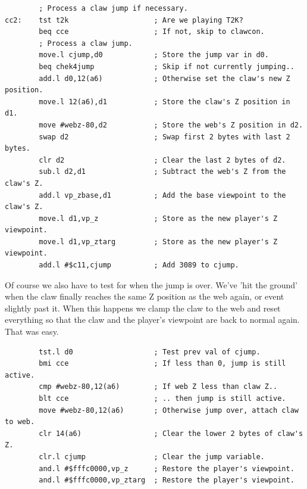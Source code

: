 \begin{lstlisting}
        ; Process a claw jump if necessary.
cc2:    tst t2k                    ; Are we playing T2K?
        beq cce                    ; If not, skip to clawcon.
        ; Process a claw jump.
        move.l cjump,d0            ; Store the jump var in d0.
        beq chek4jump              ; Skip if not currently jumping..
        add.l d0,12(a6)            ; Otherwise set the claw's new Z position.
        move.l 12(a6),d1           ; Store the claw's Z position in d1.
        move #webz-80,d2           ; Store the web's Z position in d2.
        swap d2                    ; Swap first 2 bytes with last 2 bytes.
        clr d2                     ; Clear the last 2 bytes of d2.
        sub.l d2,d1                ; Subtract the web's Z from the claw's Z.
        add.l vp_zbase,d1          ; Add the base viewpoint to the claw's Z.
        move.l d1,vp_z             ; Store as the new player's Z viewpoint.
        move.l d1,vp_ztarg         ; Store as the new player's Z viewpoint.
        add.l #$c11,cjump          ; Add 3089 to cjump.
\end{lstlisting}

Of course we also have to test for when the jump is over. We've 'hit the ground' when
the claw finally reaches the same Z position as the web again, or event slightly past it.
When this happens we clamp the claw to the web and reset everything so that the claw and
the player's viewpoint are back to normal again. That was easy.

\begin{lstlisting}
        tst.l d0                   ; Test prev val of cjump.
        bmi cce                    ; If less than 0, jump is still active.
        cmp #webz-80,12(a6)        ; If web Z less than claw Z..
        blt cce                    ; .. then jump is still active.
        move #webz-80,12(a6)       ; Otherwise jump over, attach claw to web.
        clr 14(a6)                 ; Clear the lower 2 bytes of claw's Z. 
        clr.l cjump                ; Clear the jump variable.
        and.l #$fffc0000,vp_z      ; Restore the player's viewpoint.
        and.l #$fffc0000,vp_ztarg  ; Restore the player's viewpoint.
\end{lstlisting}
